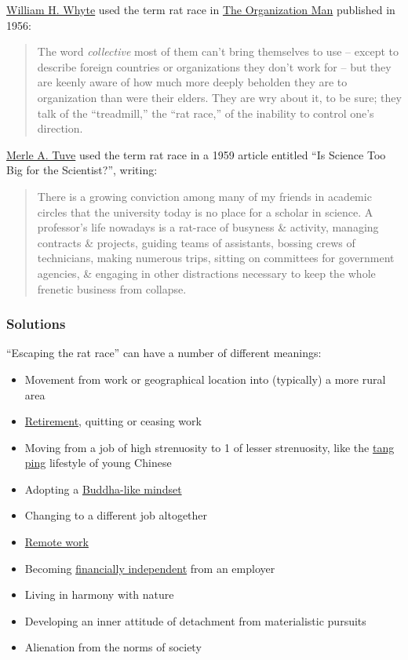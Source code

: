 \documentclass{article}
\begin{document}
\href{https://en.wikipedia.org/wiki/William_H._Whyte}{\sc William H. Whyte} used the term rat race in \href{https://en.wikipedia.org/wiki/The_Organization_Man}{The Organization Man} published in 1956:
\begin{quote}
	The word {\it collective} most of them can't bring themselves to use -- except to describe foreign countries or organizations they don't work for -- but they are keenly aware of how much more deeply beholden they are to organization than were their elders. They are wry about it, to be sure; they talk of the ``treadmill,'' the ``rat race,'' of the inability to control one's direction.
\end{quote}
\href{https://en.wikipedia.org/wiki/Merle_A._Tuve}{\sc Merle A. Tuve} used the term rat race in a 1959 article entitled ``Is Science Too Big for the Scientist?'', writing:
\begin{quote}
	There is a growing conviction among many of my friends in academic circles that the university today is no place for a scholar in science. A professor's life nowadays is a rat-race of busyness \& activity, managing contracts \& projects, guiding teams of assistants, bossing crews of technicians, making numerous trips, sitting on committees for government agencies, \& engaging in other distractions necessary to keep the whole frenetic business from collapse.
\end{quote}

\subsubsection{Solutions}
``Escaping the rat race'' can have a number of different meanings:
\begin{itemize}
	\item Movement from work or geographical location into (typically) a more rural area
	\item \href{https://en.wikipedia.org/wiki/Retirement}{Retirement}, quitting or ceasing work
	\item Moving from a job of high strenuosity to 1 of lesser strenuosity, like the \href{https://en.wikipedia.org/wiki/Tang_ping}{tang ping} lifestyle of young Chinese
	\item Adopting a \href{https://en.wikipedia.org/wiki/Buddha-like_mindset}{Buddha-like mindset}
	\item Changing to a different job altogether
	\item \href{https://en.wikipedia.org/wiki/Remote_work}{Remote work}
	\item Becoming \href{https://en.wikipedia.org/wiki/Financial_independence}{financially independent} from an employer
	\item Living in harmony with nature
	\item Developing an inner attitude of detachment from materialistic pursuits
	\item Alienation from the norms of society
\end{itemize}
\end{document}
